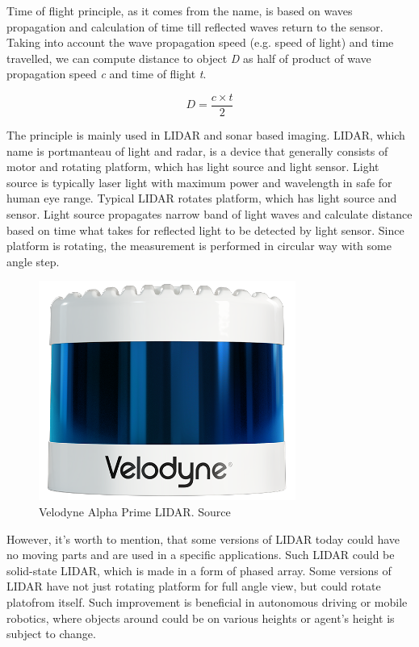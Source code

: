 \documentclass{ctuthesis}
\begin{document}
Time of flight principle, as it comes from the name, is based on waves propagation and calculation of time till reflected waves return to the sensor. Taking into account the wave propagation speed (e.g. speed of light) and time travelled, we can compute distance to object \emph{D} as half of product of wave propagation speed \emph{c} and time of flight \emph{t}.

\[ D = \frac{c \times t}{2} \]

The principle is mainly used in LIDAR and sonar based imaging. LIDAR, which name is portmanteau of light and radar, is a device that generally consists of motor and rotating platform, which has light source and light sensor. Light source is typically laser light with maximum power and wavelength in safe for human eye range. Typical LIDAR rotates platform, which has light source and sensor. Light source propagates narrow band of light waves and calculate distance based on time what takes for reflected light to be detected by light sensor. Since platform is rotating, the measurement is performed in circular way with some angle step.

\begin{figure}[htbp]
    \centering
    \includegraphics[width=0.75\textwidth]{Velodyne.png}
    \caption{Velodyne Alpha Prime LIDAR. Source \cite{velodyne}}
    \label{fig:lidar}
\end{figure}

However, it's worth to mention, that some versions of LIDAR today could have no moving parts and are used in a specific applications. Such LIDAR could be solid-state LIDAR, which is made in a form of phased array. Some versions of LIDAR have not just rotating platform for full angle view, but could rotate platofrom itself. Such improvement is beneficial in autonomous driving or mobile robotics, where objects around could be on various heights or agent's height is subject to change.
\end{document}
